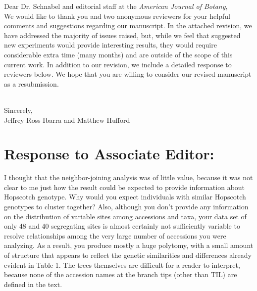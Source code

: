 \documentclass[11pt]{article}
\begin{document}
\noindent Dear Dr. Schnabel and editorial staff at the \emph{American Journal of Botany}, \\

We would like to thank you and two anonymous reviewers for your helpful comments and suggestions regarding our manuscript.  In the attached revision, we have addressed the majority of issues raised, but, while we feel that suggested new experiments would provide interesting results, they would require considerable extra time (many months) and are outside of the scope of this current work.  In addition to our revision, we include a detailed response to reviewers below. We hope that you are willing to consider our revised manuscript as a resubmission.\\\

\noindent Sincerely,\\

\noindent Jeffrey Ross-Ibarra and Matthew Hufford

\section*{Response to Associate Editor:}

I thought that the neighbor-joining analysis was of little value, because it was not clear to me just how the result could be expected to provide information about Hopscotch genotype.  Why would you expect individuals with similar Hopscotch genotypes to cluster together?  Also, although you don't provide any information on the distribution of variable sites among accessions and taxa, your data set of only 48 and 40 segregating sites is almost certainly not sufficiently variable to resolve relationships among the very large number of accessions you were analyzing.  As a result, you produce mostly a huge polytomy, with a small amount of structure that appears to reflect the genetic similarities and differences already evident in Table 1.  The trees themselves are difficult for a reader to interpret, because none of the accession names at the branch tips (other than TIL) are defined in the text.\\
\end{document}
